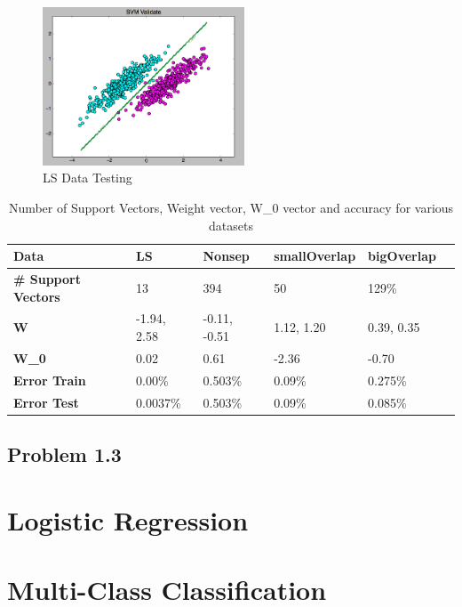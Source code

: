 \documentclass[pageno]{jpaper}
\begin{document}
\begin{figure}[ht!]
\centering
\includegraphics[width=60mm]{ls_test}
\caption{LS Data Testing}
\label{overflow}
\end{figure}



\begin{table}[h!]
  \centering
  \begin{tabular}{llllll|}
    \hline
     \textbf{Data} &\textbf{LS}  & \textbf{Nonsep}  & \textbf{smallOverlap} & \textbf{bigOverlap}\\
    \hline
    \hline
 \textbf{\# Support Vectors} 	&13 &394 &50   &129\%\\
 \hline
\textbf{W}	&-1.94, 2.58 	&  -0.11, -0.51 & 1.12, 1.20 & 0.39, 0.35 \\
 \hline
\textbf{W\_0}	&0.02	&0.61 &-2.36 &-0.70 \\
 \hline
\textbf{Error Train}	&0.00\% 	&0.503\% &0.09\% &0.275\%\\
 \hline
 \textbf{Error Test}	&0.0037\% 	&0.503\% &0.09\% &0.085\%\\
 \hline

  \end{tabular}
  \caption{Number of Support Vectors, Weight vector, W\_0 vector and accuracy for various datasets}
  \label{table:formatting}
\end{table}


\subsection{Problem 1.3}
\section{Logistic Regression}
\section{Multi-Class Classification}
\end{document}
